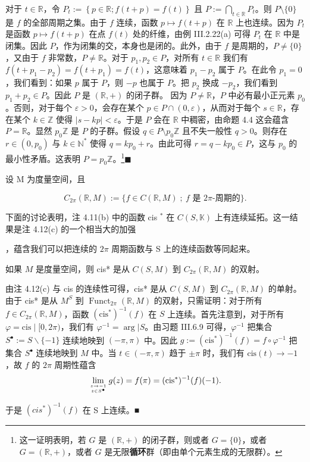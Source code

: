 \begin{remark}
\begin{items}
\proofhead
对于 $t \in \mathbb{R}$，令 $P_t := \left\{ p \in \mathbb{R} ; f(t+p) = f(t) \right\}$ 且 $P := \bigcap_{t \in \mathbb{R}} P_t$。则 $P \setminus \{0\}$ 是 $f$ 的全部周期之集。由于 $f$ 连续，函数 $p \mapsto f(t+p)$ 在 $\mathbb{R}$ 上也连续。因为 $P_t$ 是函数 $p \mapsto f(t+p)$ 在点 $f(t)$ 处的纤维，由例 III.2.22(a) 可得 $P_t$ 在 $\mathbb{R}$ 中是闭集。因此 $P$，作为闭集的交，本身也是闭的。此外，由于 $f$ 是周期的，$P \neq \{0\}$，又由于 $f$ 非常数，$P \neq \mathbb{R}$。对于 $p_1, p_2 \in P$，对所有 $t \in \mathbb{R}$ 我们有 $f(t + p_1 - p_2) = f(t + p_1) = f(t)$，这意味着 $p_1 - p_2$ 属于 $P$。在此令 $p_1 = 0$，我们看到：如果 $p$ 属于 $P$，则 $-p$ 也属于 $P$。把 $p_2$ 换成 $-p_2$，我们看到 $p_1 + p_2 \in P$。因此 $P$ 是 $(\mathbb{R}, +)$ 的闭子群。
因为 $P \neq \mathbb{R}$，$P$ 中必有最小正元素 $p_0$。否则，对于每个 $\varepsilon > 0$，会存在某个 $p \in P \cap (0, \varepsilon)$，从而对于每个 $s \in \mathbb{R}$，存在某个 $k \in \mathbb{Z}$ 使得 $|s - kp| < \varepsilon$。于是 $P$ 会在 $\mathbb{R}$ 中稠密，由命题 4.4 这会蕴含 $P = \mathbb{R}$。显然 $p_0 \mathbb{Z}$ 是 $P$ 的子群。假设 $q \in P \setminus p_0 \mathbb{Z}$ 且不失一般性 $q > 0$。则存在 $r \in (0, p_0)$ 与 $k \in \mathbb{N}^*$ 使得 $q = kp_0 + r$。由此可得 $r = q - kp_0 \in P$，这与 $p_0$ 的最小性矛盾。这表明 $P = p_0 \mathbb{Z}$。\footnote{这一证明表明，若 $ G $ 是 $ (\mathbb{R}, +) $ 的闭子群，则或者 $ G = \{0\} $，或者 $ G = (\mathbb{R}, +) $，或者 $ G $ 是无限\textbf{循环}群（即由单个元素生成的无限群）。}$ \blacksquare $
\end{items}

设 M 为度量空间，且

\[
C_{2\pi}(\mathbb{R},M):=\bigl\{f\in C(\mathbb{R},M)\;;\ f\text{ 是 }2\pi\text{-周期的}\bigr\}.
\]

下面的讨论表明，注 4.11(b) 中的函数 cis $ ^{*} $ 在  $C(S, \mathbb{K})$ 上有连续延拓。这一结果是注 4.12(c) 的一个相当大的加强

，蕴含我们可以把连续的  $2\pi$ 周期函数与 S 上的连续函数等同起来。

\end{remark}

\begin{proposition}

如果 $M$ 是度量空间，则 cis* 是从 $C(S,M)$ 到 $C_{2\pi}(\mathbb{R},M)$ 的双射。

\proofhead
由注 4.12(c) 与 cis 的连续性可得，cis* 是从 $C(S,M)$ 到 $C_{2\pi}(\mathbb{R},M)$ 的单射。由于 cis* 是从 $M^S$ 到 $\operatorname{Funct}_{2\pi}(\mathbb{R},M)$ 的双射，只需证明：对于所有 $f\in C_{2\pi}(\mathbb{R},M)$，函数 $(\mathrm{cis}^*)^{-1}(f)$ 在 $S$ 上连续。首先注意到，对于所有 $\varphi=\mathrm{cis}\mid[0,2\pi)$，我们有 $\varphi^{-1}=\arg|S$。由习题 III.6.9 可得，$\varphi^{-1}$ 把集合 $S^\bullet:=S\backslash\{-1\}$ 连续地映到 $(-\pi,\pi)$ 中。因此 $g:=(\mathrm{cis}^*)^{-1}(f)=f\circ\varphi^{-1}$ 把集合 $S^\bullet$ 连续地映到 $M$ 中。当 $t\in(-\pi,\pi)$ 趋于 $\pm\pi$ 时，我们有 $\mathrm{cis}(t)\to-1$，故 $f$ 的 $2\pi$ 周期性蕴含
\[
\lim_{z\to-1\atop z\in S^\bullet}g(z)=f(\pi)=(\mathrm{cis}^{*})^{-1}(f)(-1).
\]

于是  $(cis^{*})^{-1}(f)$ 在 S 上连续。■

\end{proposition}

